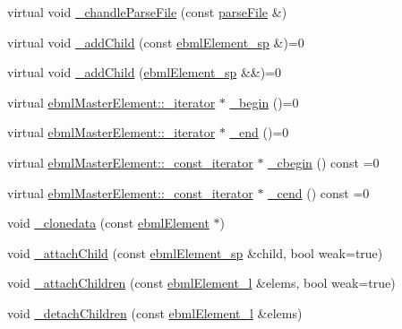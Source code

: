 \begin{DoxyCompactItemize}
\item 
virtual void \mbox{\hyperlink{classebml_1_1ebmlMasterElement_a1d1d86beffcd09cbf1ede321c088ef17}{\+\_\+chandle\+Parse\+File}} (const \mbox{\hyperlink{classebml_1_1parseFile}{parse\+File}} \&)
\item 
virtual void \mbox{\hyperlink{classebml_1_1ebmlMasterElement_a59c5f3b3409fd5fd6f0f22c7a68f1c9b}{\+\_\+add\+Child}} (const \mbox{\hyperlink{namespaceebml_adad533b7705a16bb360fe56380c5e7be}{ebml\+Element\+\_\+sp}} \&)=0
\item 
virtual void \mbox{\hyperlink{classebml_1_1ebmlMasterElement_a3af0270846a1ced1719d26dd261f0355}{\+\_\+add\+Child}} (\mbox{\hyperlink{namespaceebml_adad533b7705a16bb360fe56380c5e7be}{ebml\+Element\+\_\+sp}} \&\&)=0
\item 
virtual \mbox{\hyperlink{classebml_1_1ebmlMasterElement_1_1__iterator}{ebml\+Master\+Element\+::\+\_\+iterator}} $\ast$ \mbox{\hyperlink{classebml_1_1ebmlMasterElement_af6fb7a9934e9b8d0c64273ef6944f44b}{\+\_\+begin}} ()=0
\item 
virtual \mbox{\hyperlink{classebml_1_1ebmlMasterElement_1_1__iterator}{ebml\+Master\+Element\+::\+\_\+iterator}} $\ast$ \mbox{\hyperlink{classebml_1_1ebmlMasterElement_a352e5e11836063394990cb05c09d8e48}{\+\_\+end}} ()=0
\item 
virtual \mbox{\hyperlink{classebml_1_1ebmlMasterElement_1_1__const__iterator}{ebml\+Master\+Element\+::\+\_\+const\+\_\+iterator}} $\ast$ \mbox{\hyperlink{classebml_1_1ebmlMasterElement_a7e1ffa498e22b637a6671df14aa0bc45}{\+\_\+cbegin}} () const =0
\item 
virtual \mbox{\hyperlink{classebml_1_1ebmlMasterElement_1_1__const__iterator}{ebml\+Master\+Element\+::\+\_\+const\+\_\+iterator}} $\ast$ \mbox{\hyperlink{classebml_1_1ebmlMasterElement_ae6cdbf68d8267a7ab098bd402fa70e88}{\+\_\+cend}} () const =0
\item 
void \mbox{\hyperlink{classebml_1_1ebmlMasterElement_a9bde42f70ab39592c4dccb6bf04904d4}{\+\_\+clonedata}} (const \mbox{\hyperlink{classebml_1_1ebmlElement}{ebml\+Element}} $\ast$)
\item 
void \mbox{\hyperlink{classebml_1_1ebmlMasterElement_a16b141ac7d241a9b95c029761fdfc02f}{\+\_\+attach\+Child}} (const \mbox{\hyperlink{namespaceebml_adad533b7705a16bb360fe56380c5e7be}{ebml\+Element\+\_\+sp}} \&child, bool weak=true)
\item 
void \mbox{\hyperlink{classebml_1_1ebmlMasterElement_ad4a20efe80537fde72af4584f67fb645}{\+\_\+attach\+Children}} (const \mbox{\hyperlink{namespaceebml_a1ddadd26791f273d851882653b9caf70}{ebml\+Element\+\_\+l}} \&elems, bool weak=true)
\item 
void \mbox{\hyperlink{classebml_1_1ebmlMasterElement_a3102fb532e6701cfeecf3877dbb43da3}{\+\_\+detach\+Children}} (const \mbox{\hyperlink{namespaceebml_a1ddadd26791f273d851882653b9caf70}{ebml\+Element\+\_\+l}} \&elems)
\end{DoxyCompactItemize}
